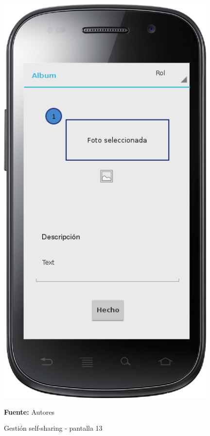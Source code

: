 \begin{figure}[!htb]
  \begin{center}
    \includegraphics[width=11cm]{./imagenes/UI/Self_sharing/self_sharing_13.png}
    \caption{Gestión self-sharing - pantalla 13}
    \label{fig:self_sharing_13}
    \textbf{Fuente:}  Autores
  \end{center}
\end{figure}


